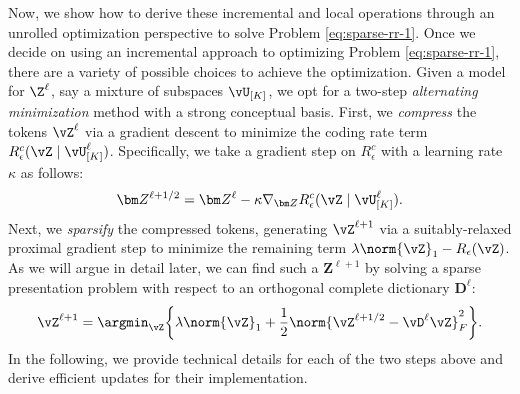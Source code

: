 \documentclass[../../book-main.tex]{subfiles}
\begin{document}
Now, we show how to derive these incremental and local operations
through an unrolled optimization perspective to solve Problem
\eqref{eq:sparse-rr-1}.  Once we decide on using an incremental
approach to optimizing Problem
\eqref{eq:sparse-rr-1}, there are a variety of possible choices to
achieve the optimization. Given a model for $\Z^\ell$, say a mixture
of subspaces $\vU_{[K]}$, we opt for a two-step \textit{alternating
minimization} method with a strong conceptual basis. First, we
\textit{compress} the tokens $\vZ^{\ell}$ via a gradient descent to
minimize the coding rate term $R^c_\epsilon (\vZ \mid
\vU_{[K]}^\ell)$. Specifically, we take a gradient step on
$R^c_\epsilon$ with a learning rate $\kappa$ as follows:
\begin{align}\label{eq:Z l+1/2}
    \bm Z^{\ell+1/2} = \bm Z^\ell - \kappa \nabla_{\bm Z}
    R^c_\epsilon (\vZ \mid \vU_{[K]}^\ell).
\end{align}
Next, we \textit{sparsify} the compressed tokens, generating
\(\vZ^{\ell + 1}\) via a suitably-relaxed proximal gradient step to
minimize the remaining term $\lambda \norm{\vZ}_{1} -
R_{\epsilon}(\vZ)$. As we will argue in detail later, we can find
such a $\bm Z^{\ell+1}$ by solving a sparse presentation problem with
respect to an orthogonal complete dictionary $\bm D^\ell$:
\begin{equation}\label{eq:Z l+1}
    \vZ^{\ell+1} = \argmin_{{\vZ}}  \bigg\{\lambda \norm{\vZ}_1 +
    \frac{1}{2}\norm{\vZ^{\ell + 1/2} - \vD^{\ell} {\vZ}}_F^2\bigg\}.
\end{equation}
In the following, we provide technical details for each of the two
steps above and derive efficient updates for their implementation.
\end{document}
